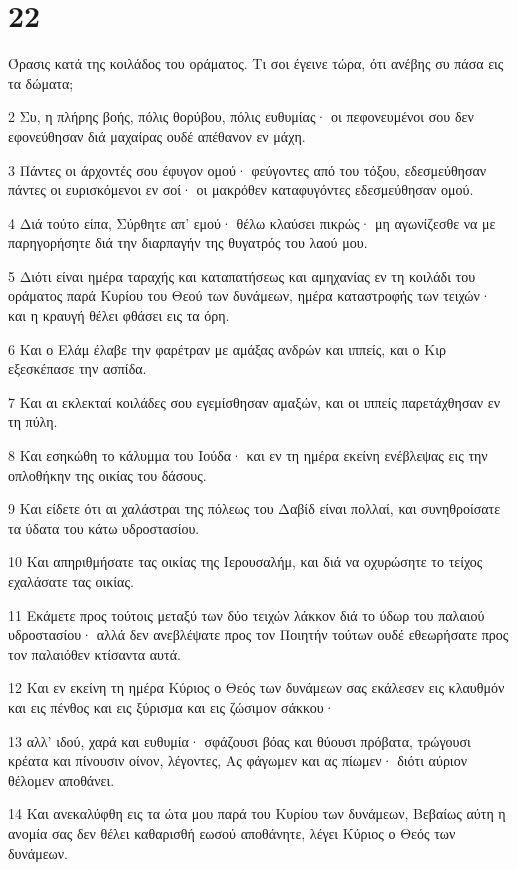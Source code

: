 \chapter{22}

\par Όρασις κατά της κοιλάδος του οράματος. Τι σοι έγεινε τώρα, ότι ανέβης συ πάσα εις τα δώματα;
\par 2 Συ, η πλήρης βοής, πόλις θορύβου, πόλις ευθυμίας· οι πεφονευμένοι σου δεν εφονεύθησαν διά μαχαίρας ουδέ απέθανον εν μάχη.
\par 3 Πάντες οι άρχοντές σου έφυγον ομού· φεύγοντες από του τόξου, εδεσμεύθησαν πάντες οι ευρισκόμενοι εν σοί· οι μακρόθεν καταφυγόντες εδεσμεύθησαν ομού.
\par 4 Διά τούτο είπα, Σύρθητε απ' εμού· θέλω κλαύσει πικρώς· μη αγωνίζεσθε να με παρηγορήσητε διά την διαρπαγήν της θυγατρός του λαού μου.
\par 5 Διότι είναι ημέρα ταραχής και καταπατήσεως και αμηχανίας εν τη κοιλάδι του οράματος παρά Κυρίου του Θεού των δυνάμεων, ημέρα καταστροφής των τειχών· και η κραυγή θέλει φθάσει εις τα όρη.
\par 6 Και ο Ελάμ έλαβε την φαρέτραν με αμάξας ανδρών και ιππείς, και ο Κιρ εξεσκέπασε την ασπίδα.
\par 7 Και αι εκλεκταί κοιλάδες σου εγεμίσθησαν αμαξών, και οι ιππείς παρετάχθησαν εν τη πύλη.
\par 8 Και εσηκώθη το κάλυμμα του Ιούδα· και εν τη ημέρα εκείνη ενέβλεψας εις την οπλοθήκην της οικίας του δάσους.
\par 9 Και είδετε ότι αι χαλάστραι της πόλεως του Δαβίδ είναι πολλαί, και συνηθροίσατε τα ύδατα του κάτω υδροστασίου.
\par 10 Και απηριθμήσατε τας οικίας της Ιερουσαλήμ, και διά να οχυρώσητε το τείχος εχαλάσατε τας οικίας.
\par 11 Εκάμετε προς τούτοις μεταξύ των δύο τειχών λάκκον διά το ύδωρ του παλαιού υδροστασίου· αλλά δεν ανεβλέψατε προς τον Ποιητήν τούτων ουδέ εθεωρήσατε προς τον παλαιόθεν κτίσαντα αυτά.
\par 12 Και εν εκείνη τη ημέρα Κύριος ο Θεός των δυνάμεων σας εκάλεσεν εις κλαυθμόν και εις πένθος και εις ξύρισμα και εις ζώσιμον σάκκου·
\par 13 αλλ' ιδού, χαρά και ευθυμία· σφάζουσι βόας και θύουσι πρόβατα, τρώγουσι κρέατα και πίνουσιν οίνον, λέγοντες, Ας φάγωμεν και ας πίωμεν· διότι αύριον θέλομεν αποθάνει.
\par 14 Και ανεκαλύφθη εις τα ώτα μου παρά του Κυρίου των δυνάμεων, Βεβαίως αύτη η ανομία σας δεν θέλει καθαρισθή εωσού αποθάνητε, λέγει Κύριος ο Θεός των δυνάμεων.

